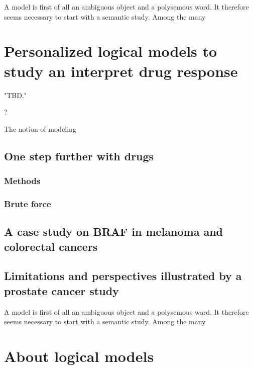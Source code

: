 \documentclass[a4paper,12pt,twoside,onecolumn,openright,final,oldfontcommands]{memoir}
\newcommand{\initial}[1]{
	\lettrine[lines=3,lhang=0.33,nindent=0em]{
		\color{gray}
     		{\textsc{#1}}}{}}
\begin{document}
A model is first of all an ambiguous object and a polysemous word. It
therefore seems necessary to start with a semantic study. Among the many

\chapter{Personalized logical models to study an interpret drug
response}\label{personalized-logical-models-to-study-an-interpret-drug-response}

\epigraph{"TBD."}{?}

\initial{T}he notion of modeling

\section{One step further with drugs}\label{one-step-further-with-drugs}

\subsection{Methods}\label{methods}

\subsection{Brute force}\label{brute-force}

\section{A case study on BRAF in melanoma and colorectal
cancers}\label{a-case-study-on-braf-in-melanoma-and-colorectal-cancers}

\section{Limitations and perspectives illustrated by a prostate cancer
study}\label{limitations-and-perspectives-illustrated-by-a-prostate-cancer-study}

A model is first of all an ambiguous object and a polysemous word. It
therefore seems necessary to start with a semantic study. Among the many

\appendix {}


\chapter{About logical models}\label{about-logical-models}
\end{document}
